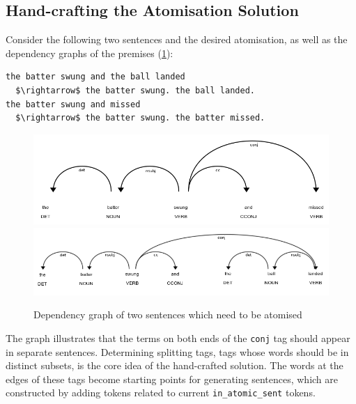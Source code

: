 \subsection{Hand-crafting the Atomisation Solution}
\label{hand-crafting-the-atomisation-solution}

Consider the following two sentences and the desired atomisation, as well as the dependency graphs of the premises (\ref{atomisation-examples}):
\begin{lstlisting}
the batter swung and the ball landed 
  $\rightarrow$ the batter swung. the ball landed.
the batter swung and missed 
  $\rightarrow$ the batter swung. the batter missed.
\end{lstlisting}


\begin{figure}[h]
\caption{Dependency graph of two sentences which need to be atomised}
\centering
\includegraphics[width=\textwidth]{solving-nlp-tasks-logically/dependency-graph-one-subj.png}
\includegraphics[width=\textwidth]{solving-nlp-tasks-logically/dependency-graph-two-subj.png}
\label{atomisation-examples}
\end{figure}

The graph illustrates that the terms on both ends of the \verb_conj_ tag should appear in separate sentences. 
Determining splitting tags, tags whose words should be in distinct subsets, is the core idea of the hand-crafted solution.
The words at the edges of these tags become starting points for generating sentences, which are constructed by adding tokens related to current \verb+in_atomic_sent+ tokens.

